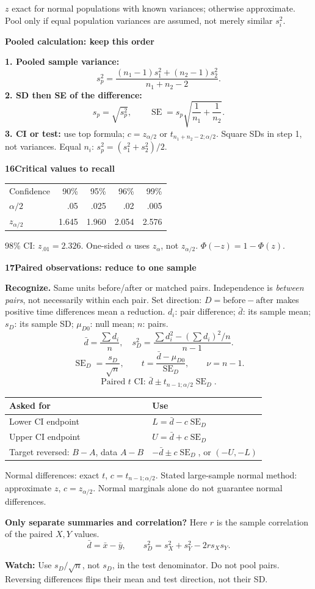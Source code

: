 \documentclass[a4paper,landscape]{article}
\newcommand{\head}[2][late]{\par\vspace{3pt}\noindent\colorbox{#1}{\parbox{\dimexpr\linewidth-6pt}{\color{white}\bfseries #2}}\par\vspace{1pt}}
\newcommand{\cue}[1]{\par\textbf{#1}\enspace}
\newcommand{\trap}[1]{\par{\color{alert}\textbf{Watch:} #1}}
\newcommand{\SE}{\operatorname{SE}}
\newcommand{\xb}{\bar x}
\newcommand{\db}{\bar d}
\newcommand{\col}{\par\vfill\columnbreak}
\newcommand{\tblhead}[1]{\textbf{#1}}
\newcommand{\subhead}[1]{\par\vspace{2pt}\textcolor{late}{\textbf{#1}}\par}
\begin{document}
\begin{multicols*}{4}
\begin{tabular}{@{}L{.39\linewidth}L{.55\linewidth}@{}}
\end{tabular}
\(z\) exact for normal populations with known variances; otherwise approximate. Pool only if equal population variances are assumed, not merely similar \(s_i^2\).
\subhead{Pooled calculation: keep this order}
\textbf{1. Pooled sample variance:}
\[s_p^2=\frac{(n_1-1)s_1^2+(n_2-1)s_2^2}{n_1+n_2-2}.\]
\textbf{2. SD then SE of the difference:}
\[s_p=\sqrt{s_p^2},\qquad
 \SE=s_p\sqrt{\frac1{n_1}+\frac1{n_2}}.\]
\textbf{3. CI or test:} use top formula; \(c=z_{\alpha/2}\) or \(t_{n_1+n_2-2;\alpha/2}\). Square SDs in step 1, not variances. Equal \(n_i\): \(s_p^2=(s_1^2+s_2^2)/2\).
\head{16\quad Critical values to recall}
\begin{tabular}{@{}lrrrr@{}}
Confidence &90\%&95\%&96\%&99\%\\
\(\alpha/2\)&.05&.025&.02&.005\\
\(z_{\alpha/2}\)&1.645&1.960&2.054&2.576
\end{tabular}\par
98\% CI: \(z_{.01}=2.326\). One-sided \(\alpha\) uses \(z_\alpha\), not \(z_{\alpha/2}\). \(\Phi(-z)=1-\Phi(z)\).
\col
\head{17\quad Paired observations: reduce to one sample}
\cue{Recognize.} Same units before/after or matched pairs. Independence is \emph{between pairs}, not necessarily within each pair. Set direction: \(D=\text{before}-\text{after}\) makes positive time differences mean a reduction.
\(d_i\): pair difference; \(\db\): its sample mean; \(s_D\): its sample SD; \(\mu_{D0}\): null mean; \(n\): pairs.
\[\db=\frac{\sum d_i}{n},\quad
 s_D^2=\frac{\sum d_i^2-(\sum d_i)^2/n}{n-1}.\]
\[\SE_D=\frac{s_D}{\sqrt n},\qquad
 t=\frac{\db-\mu_{D0}}{\SE_D},\qquad\nu=n-1.\]
\[\text{Paired }t\text{ CI: }\db\pm t_{n-1;\alpha/2}\SE_D.\]
\begin{tabular}{@{}L{.44\linewidth}L{.50\linewidth}@{}}
\tblhead{Asked for} & \tblhead{Use}\\\hline
Lower CI endpoint & \(L=\db-c\SE_D\)\\
Upper CI endpoint & \(U=\db+c\SE_D\)\\
Target reversed: \(B-A\), data \(A-B\) & \(-\db\pm c\SE_D\), or \((-U,-L)\)
\end{tabular}
Normal differences: exact \(t\), \(c=t_{n-1;\alpha/2}\). Stated large-sample normal method: approximate \(z\), \(c=z_{\alpha/2}\). Normal marginals alone do not guarantee normal differences.
\cue{Only separate summaries and correlation?}
Here \(r\) is the sample correlation of the paired \(X,Y\) values.
\[\db=\xb-\bar y,\qquad s_D^2=s_X^2+s_Y^2-2rs_Xs_Y.\]
\trap{Use \(s_D/\sqrt n\), not \(s_D\), in the test denominator. Do not pool pairs. Reversing differences flips their mean and test direction, not their SD.}

\end{multicols*}
\end{document}
